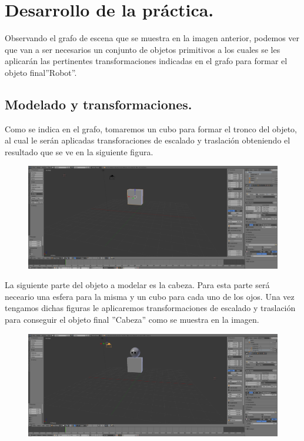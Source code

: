 \documentclass[10pt]{article}
\begin{document}
\section{Desarrollo de la práctica.}

Observando el grafo de escena que se muestra en la imagen anterior, podemos ver que van a ser necesarios un conjunto de objetos primitivos a los cuales se les aplicarán las pertinentes transformaciones indicadas en el grafo para formar el objeto final''Robot''. \\

\subsection{Modelado y transformaciones.}

Como se indica en el grafo, tomaremos un cubo para formar el tronco del objeto, al cual le serán aplicadas transforaciones de escalado y traslación obteniendo el resultado que se ve en la siguiente figura.\\

\begin{figure}[H]
	\begin{center}
	 		\includegraphics[width = 1.00\textwidth]{Imagenes/p2-img2.png}
	\end{center} 
\end{figure}

La siguiente parte del objeto a modelar es la cabeza. Para esta parte será neceario una esfera para la misma y un cubo para cada uno de los ojos. Una vez tengamos dichas figuras le aplicaremos transformaciones de escalado y traslación para conseguir el objeto final ''Cabeza'' como se muestra en la imagen.\\

\begin{figure}[H]
	\begin{center}
	 		\includegraphics[width = 1.00\textwidth]{Imagenes/p2-img3.png}
	\end{center} 
\end{figure}
\end{document}
